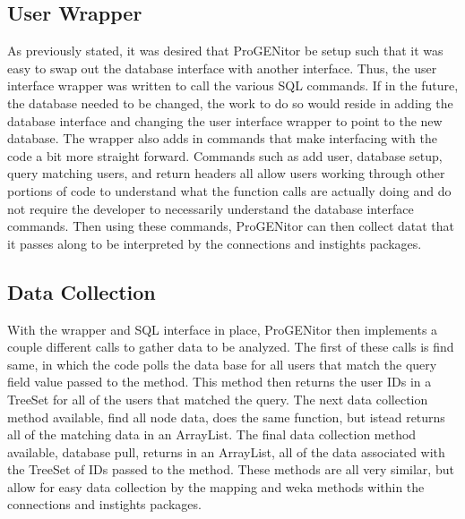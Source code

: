 \subsection{User Wrapper}
As previously stated, it was desired that ProGENitor be setup such that it was
easy to swap out the database interface with another interface.  Thus, the user
interface wrapper was written to call the various SQL commands.  If in the
future, the database needed to be changed, the work to do so would reside in
adding the database interface and changing the user interface wrapper to point
to the new database.  The wrapper also adds in commands that make interfacing
with the code a bit more straight forward.  Commands such as add user, database
setup, query matching users, and return headers all allow users working through
other portions of code to understand what the function calls are actually doing
and do not require the developer to necessarily understand the database
interface commands.  Then using these commands, ProGENitor can then collect
datat that it passes along to be interpreted by the connections and instights
packages.

\subsection{Data Collection}
With the wrapper and SQL interface in place, ProGENitor then implements a couple
different calls to gather data to be analyzed.  The first of these calls is find
same, in which the code polls the data base for all users that match the query
field value passed to the method.  This method then returns the user IDs in a
TreeSet for all of the users that matched the query.  The next data collection
method available, find all node data, does the same function, but istead returns all of the
matching data in an ArrayList.  The final data collection method available,
database pull, returns in an ArrayList, all of the data associated with the
TreeSet of IDs passed to the method.  These methods are all very similar, but
allow for easy data collection by the mapping and weka methods within the
connections and instights packages.
